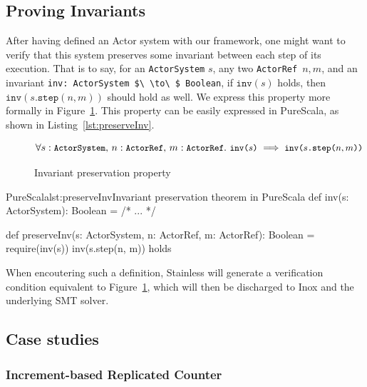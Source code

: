 \documentclass[a4paper,twoside]{article}
\newcommand{\InlineS}[1]{\lstinline[language=PureScala,basicstyle=\small\ttfamily,columns=fixed]|#1|}
\newcommand{\TODO}[1]{\textcolor{YellowOrange}{(TODO: #1)}} %
\newcommand{\RefFig}[1]{Figure~\ref{#1}}
\newcommand{\RefCode}[1]{Listing~\ref{#1}}
\newcommand{\ActorRef}{\InlineS{ActorRef}\ }
\newcommand{\stt}[1]{\texttt{\small{#1}}}
\begin{document}
\subsection{Proving Invariants}
\label{invariants}

After having defined an Actor system with our framework, one might want to verify that this 
system preserves some invariant between each step of its execution. That is to say, 
for an \InlineS{ActorSystem} $s$, any two \ActorRef $n, m$,
and an invariant \InlineS{inv: ActorSystem $\ \to\ $ Boolean}, if $\texttt{inv}(s)$ holds, 
then $\texttt{inv}(s\texttt{.step}(n, m))$ should hold as well. We express this 
property more formally in \RefFig{fig:stepinvariant}. This property can be easily expressed in PureScala, as shown in \RefCode{lst:preserveInv}.

\begin{figure}[!h]
$$\forall s: \stt{ActorSystem},\, n: \stt{ActorRef},\, m: \stt{ActorRef}.\ \stt{inv($s$)} \implies \stt{inv($s$.step($n, m$))}$$
\vspace{-20pt}
\caption{Invariant preservation property\label{fig:stepinvariant}}
\end{figure}

\begin{Code}{PureScala}{lst:preserveInv}{Invariant preservation theorem in PureScala}
def inv(s: ActorSystem): Boolean = {
  /* ... */
}

def preserveInv(s: ActorSystem, n: ActorRef, m: ActorRef): Boolean = {
  require(inv(s))
  inv(s.step(n, m))
} holds
\end{Code}

When encoutering such a definition, Stainless will generate a verification condition 
equivalent to \RefFig{fig:stepinvariant}, which will then be discharged to Inox and the underlying SMT solver.

%

\subsection{Case studies}
\label{casestudies}

\subsubsection{Increment-based Replicated Counter}
\label{repcounterinc}
\end{document}
